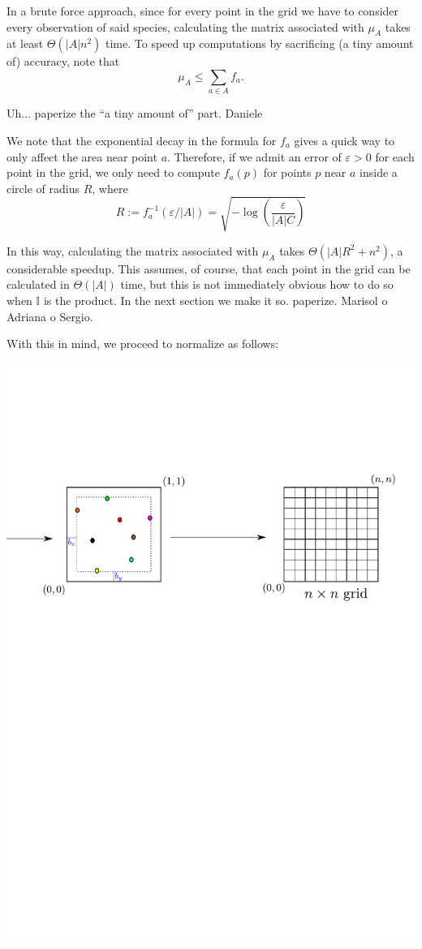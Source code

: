 \documentclass[12pt]{article}
\numberwithin{equation}{section} %
\numberwithin{figure}{section} %
\def\II{{\mathbb{I}}}
\theoremstyle{definition}
\def\tcr#1{\textcolor{MyRed}{#1}}
\begin{document}
	In a brute force approach, since for every point in the grid we have to consider every observation of said species, calculating the matrix associated with $\mu_A$ takes at least $\Theta(|A|n^2)$ time. To speed up computations by sacrificing \tcr{(a tiny amount of)} accuracy, note that 
		$$\mu_A \leq \sum_{a\in A} f_a.$$
		
		\tcr{Uh... paperize the ``a tiny amount of'' part. Daniele}
		
	We note that the exponential decay in the formula for $f_a$ gives a quick way to only affect the area near point $a$. Therefore, if we admit an error of $\varepsilon > 0$ for each point in the grid, we only need to compute $f_a(p)$ for points $p$ near $a$ inside a circle of radius $R$, where
		$$R := f_a^{-1}(\varepsilon/|A|) = \sqrt{-\log\left(\frac{\varepsilon}{|A|C}\right)}$$
	
	In this way, calculating the matrix associated with $\mu_A$ takes $\Theta(|A|R^2 + n^2)$, a considerable speedup. This assumes, of course, that each point in the grid can be calculated in $\Theta(|A|)$ time, but this is not immediately obvious how to do so when $\II$ is the product. In the next section we make it so. \tcr{paperize. Marisol o Adriana o Sergio}.
	
	With this in mind, we proceed to normalize as follows:
	\begin{center}
		\includegraphics[scale=0.5]{./continuoamalla.pdf}
	\end{center}
	
\end{document}
